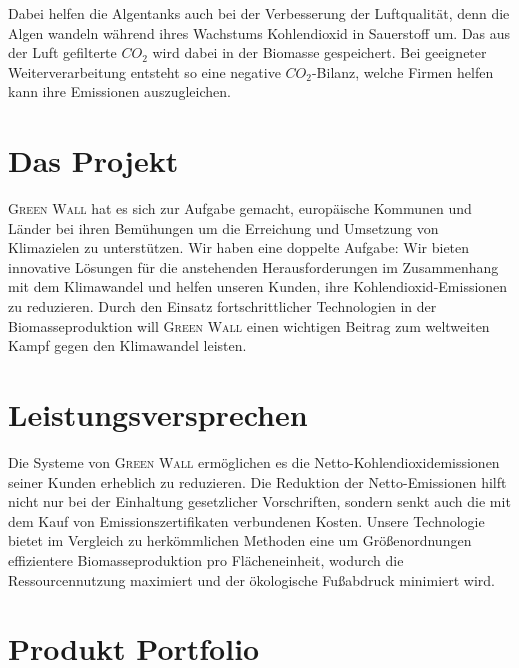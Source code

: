Dabei helfen die Algentanks auch bei der Verbesserung der Luftqualität, denn die Algen wandeln während ihres Wachstums Kohlendioxid in Sauerstoff um.
Das aus der Luft gefilterte \(CO_2\) wird dabei in der Biomasse gespeichert.
Bei geeigneter Weiterverarbeitung entsteht so eine negative \(CO_2\)-Bilanz, welche Firmen helfen kann ihre Emissionen auszugleichen.

\section{Das Projekt}
\textsc{Green Wall} hat es sich zur Aufgabe gemacht, europäische Kommunen und Länder bei ihren Bemühungen um die Erreichung und Umsetzung von Klimazielen zu unterstützen.
Wir haben eine doppelte Aufgabe: Wir bieten innovative Lösungen für die anstehenden Herausforderungen im Zusammenhang mit dem Klimawandel und helfen unseren Kunden, ihre Kohlendioxid-Emissionen zu reduzieren.
Durch den Einsatz fortschrittlicher Technologien in der Biomasseproduktion will \textsc{Green Wall} einen wichtigen Beitrag zum weltweiten Kampf gegen den Klimawandel leisten.

\section{Leistungsversprechen}
Die Systeme von \textsc{Green Wall} ermöglichen es die Netto-Kohlendioxidemissionen seiner Kunden erheblich zu reduzieren.
Die Reduktion der Netto-Emissionen hilft nicht nur bei der Einhaltung gesetzlicher Vorschriften, sondern senkt auch die mit dem Kauf von Emissionszertifikaten verbundenen Kosten.
Unsere Technologie bietet im Vergleich zu herkömmlichen Methoden eine um Größenordnungen effizientere Biomasseproduktion pro Flächeneinheit, wodurch die Ressourcennutzung maximiert und der ökologische Fußabdruck minimiert wird.

\section{Produkt Portfolio}

